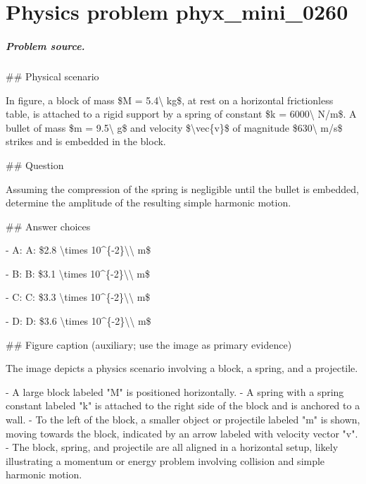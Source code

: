 
\chapter{Physics problem phyx\_mini\_0260}
\label{ch:PhyXMiniProblems_problem_phyx_mini_0260}

\paragraph{Problem source.}
\#\# Physical scenario

In figure, a block of mass \$M = 5.4\textbackslash{} kg\$, at rest on a horizontal frictionless table, is attached to a rigid support by a spring of constant \$k = 6000\textbackslash{} N/m\$. A bullet of mass \$m = 9.5\textbackslash{} g\$ and velocity \$\textbackslash{}vec\{v\}\$ of magnitude \$630\textbackslash{} m/s\$ strikes and is embedded in the block.

\#\# Question

Assuming the compression of the spring is negligible until the bullet is embedded, determine the amplitude of the resulting simple harmonic motion.

\#\# Answer choices

- A: A: \$2.8 \textbackslash{}times 10\textasciicircum{}\{-2\}\textbackslash{}\textbackslash{} m\$

- B: B: \$3.1 \textbackslash{}times 10\textasciicircum{}\{-2\}\textbackslash{}\textbackslash{} m\$

- C: C: \$3.3 \textbackslash{}times 10\textasciicircum{}\{-2\}\textbackslash{}\textbackslash{} m\$

- D: D: \$3.6 \textbackslash{}times 10\textasciicircum{}\{-2\}\textbackslash{}\textbackslash{} m\$

\#\# Figure caption (auxiliary; use the image as primary evidence)

The image depicts a physics scenario involving a block, a spring, and a projectile. 

- A large block labeled "M" is positioned horizontally.
- A spring with a spring constant labeled "k" is attached to the right side of the block and is anchored to a wall.
- To the left of the block, a smaller object or projectile labeled "m" is shown, moving towards the block, indicated by an arrow labeled with velocity vector "v".
- The block, spring, and projectile are all aligned in a horizontal setup, likely illustrating a momentum or energy problem involving collision and simple harmonic motion.

